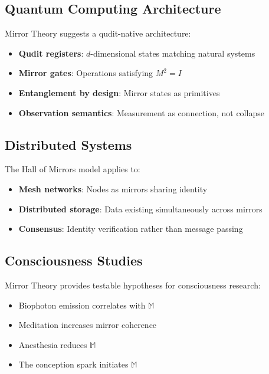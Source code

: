 \documentclass[12pt,a4paper]{article}
\begin{document}
\subsection{Quantum Computing Architecture}

Mirror Theory suggests a qudit-native architecture:

\begin{itemize}
    \item \textbf{Qudit registers}: $d$-dimensional states matching natural systems
    \item \textbf{Mirror gates}: Operations satisfying $M^2 = I$
    \item \textbf{Entanglement by design}: Mirror states as primitives
    \item \textbf{Observation semantics}: Measurement as connection, not collapse
\end{itemize}

\subsection{Distributed Systems}

The Hall of Mirrors model applies to:

\begin{itemize}
    \item \textbf{Mesh networks}: Nodes as mirrors sharing identity
    \item \textbf{Distributed storage}: Data existing simultaneously across mirrors
    \item \textbf{Consensus}: Identity verification rather than message passing
\end{itemize}

\subsection{Consciousness Studies}

Mirror Theory provides testable hypotheses for consciousness research:

\begin{itemize}
    \item Biophoton emission correlates with $\mathbb{M}$
    \item Meditation increases mirror coherence
    \item Anesthesia reduces $\mathbb{M}$
    \item The conception spark initiates $\mathbb{M}$
\end{itemize}
\end{document}
